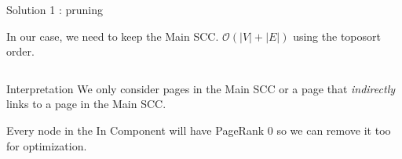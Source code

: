 \documentclass[10pt]{beamer}
\newcommand\bigoh{\mathcal{O}}
\begin{document}
\begin{frame}[allowframebreaks]{Solution 1 : pruning}
\begin{center}
  \end{center}
  In our case, we need to keep the Main SCC.
  $\bigoh(|V| + |E|)$ using the toposort order.

  \framebreak

  \begin{columns}
    \begin{column}{0.5\textwidth}
      \begin{block}{Interpretation}
        We only consider pages in the Main SCC or a page that \emph{indirectly} links to a page in the Main SCC.
      \end{block}
      Every node in the In Component will have PageRank 0 so we can remove it too for optimization.


\end{column}
\end{columns}
\end{frame}
\end{document}
